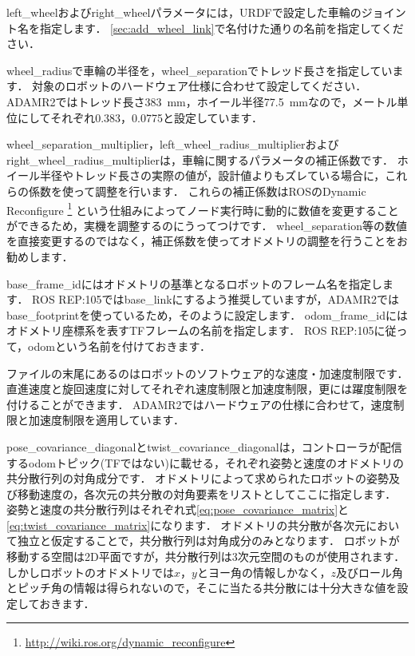 \documentclass[{../../master}]{subfiles}
\begin{document}
\textsf{left\_wheel}および\textsf{right\_wheel}パラメータには，URDFで設定した車輪のジョイント名を指定します．
\ref{sec:add_wheel_link}で名付けた通りの名前を指定してください．

\textsf{wheel\_radius}で車輪の半径を，\textsf{wheel\_separation}でトレッド長さを指定しています．
対象のロボットのハードウェア仕様に合わせて設定してください．
ADAMR2ではトレッド長さ\SI{383}{mm}，ホイール半径\SI{77.5}{mm}なので，メートル単位にしてそれぞれ0.383，0.0775と設定しています．

\textsf{wheel\_separation\_multiplier}，\textsf{left\_wheel\_radius\_multiplier}および\textsf{right\_wheel\_radius\_multiplier}は，車輪に関するパラメータの補正係数です．
ホイール半径やトレッド長さの実際の値が，設計値よりもズレている場合に，これらの係数を使って調整を行います．
これらの補正係数はROSのDynamic Reconfigure
\footnote{\url{http://wiki.ros.org/dynamic_reconfigure}}
という仕組みによってノード実行時に動的に数値を変更することができるため，実機を調整するのにうってつけです．
\textsf{wheel\_separation}等の数値を直接変更するのではなく，補正係数を使ってオドメトリの調整を行うことをお勧めします．

\textsf{base\_frame\_id}にはオドメトリの基準となるロボットのフレーム名を指定します．
ROS REP:105では\textsf{base\_link}にするよう推奨していますが，ADAMR2では\textsf{base\_footprint}を使っているため，そのように設定します．
\textsf{odom\_frame\_id}にはオドメトリ座標系を表すTFフレームの名前を指定します．
ROS REP:105に従って，\textsf{odom}という名前を付けておきます．

ファイルの末尾にあるのはロボットのソフトウェア的な速度・加速度制限です．
直進速度と旋回速度に対してそれぞれ速度制限と加速度制限，更には躍度制限を付けることができます．
ADAMR2ではハードウェアの仕様に合わせて，速度制限と加速度制限を適用しています．

\textsf{pose\_covariance\_diagonal}と\textsf{twist\_covariance\_diagonal}は，コントローラが配信する\textsf{odom}トピック(TFではない)に載せる，それぞれ姿勢と速度のオドメトリの共分散行列の対角成分です．
オドメトリによって求められたロボットの姿勢及び移動速度の，各次元の共分散の対角要素をリストとしてここに指定します．
姿勢と速度の共分散行列はそれぞれ式\ref{eq:pose_covariance_matrix}と\ref{eq:twist_covariance_matrix}になります．
オドメトリの共分散が各次元において独立と仮定することで，共分散行列は対角成分のみとなります．
ロボットが移動する空間は2D平面ですが，共分散行列は3次元空間のものが使用されます．
しかしロボットのオドメトリでは$x$，$y$とヨー角の情報しかなく，$z$及びロール角とピッチ角の情報は得られないので，そこに当たる共分散には十分大きな値を設定しておきます．
\end{document}
